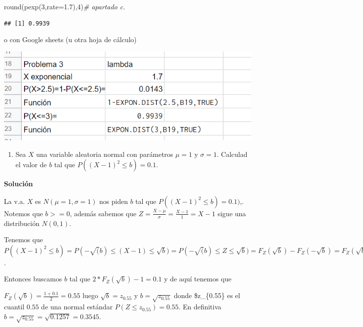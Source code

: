 \documentclass[
]{article}
\newenvironment{Shaded}{\begin{snugshade}}{\end{snugshade}}
\newcommand{\AttributeTok}[1]{\textcolor[rgb]{0.77,0.63,0.00}{#1}}
\newcommand{\CommentTok}[1]{\textcolor[rgb]{0.56,0.35,0.01}{\textit{#1}}}
\newcommand{\DecValTok}[1]{\textcolor[rgb]{0.00,0.00,0.81}{#1}}
\newcommand{\FloatTok}[1]{\textcolor[rgb]{0.00,0.00,0.81}{#1}}
\newcommand{\FunctionTok}[1]{\textcolor[rgb]{0.00,0.00,0.00}{#1}}
\newcommand{\NormalTok}[1]{#1}
\providecommand{\tightlist}{%
  \setlength{\itemsep}{0pt}\setlength{\parskip}{0pt}}
\begin{document}
\begin{Shaded}
\begin{Highlighting}[]
\FunctionTok{round}\NormalTok{(}\FunctionTok{pexp}\NormalTok{(}\DecValTok{3}\NormalTok{,}\AttributeTok{rate=}\FloatTok{1.7}\NormalTok{),}\DecValTok{4}\NormalTok{)}\CommentTok{\# apartado c.}
\end{Highlighting}
\end{Shaded}

\begin{verbatim}
## [1] 0.9939
\end{verbatim}

o con Google sheets (u otra hoja de cálculo)

\includegraphics[width=8.85in]{pro3_cont_1}

\newpage

\begin{enumerate}
\def\labelenumi{\arabic{enumi}.}
\setcounter{enumi}{3}
\tightlist
\item
  Sea \(X\) una variable aleatoria normal con parámetros \(\mu=1\) y
  \(\sigma=1\). Calculad el valor de \(b\) tal que
  \(P\left((X-1)^2\leq b\right)=0.1\).
\end{enumerate}

\textbf{Solución}

La v.a. \(X\) es \(N(\mu=1,\sigma=1)\) nos piden \(b\) tal que
\(P((X-1)^2\leq b)=0.1)\),. Notemos que \(b>=0\), además sabemos que
\(Z=\frac{X-\mu}{\sigma}=\frac{X-1}{1}=X-1\) sigue una distribución
\(N(0,1)\).

Tenemos que
\(P((X-1)^2\leq b)=P(-\sqrt(b)\leq (X-1)\leq\sqrt{b})=P(-\sqrt(b)\leq Z\leq \sqrt{b})=F_Z(\sqrt{b})-F_Z(-\sqrt{b})=F_Z(\sqrt{b})-(1-F_Z(\sqrt{b}))= 2*F_Z(\sqrt{b})-1\).

Entonces buscamos \(b\) tal que \(2*F_Z(\sqrt{b})-1=0.1\) y de aquí
tenemos que

\(F_Z(\sqrt{b})=\frac{1+0.1}{2}=0.55\) luego \(\sqrt{b}=z_{0.55}\) y
\(b=\sqrt{z_{0.55}}\) donde \$z\_\{0.55\} es el cuantil \(0.55\) de una
normal estándar \(P(Z\leq z_{0.55})=0.55.\) En definitiva
\(b=\sqrt{z_{0.55}}=\sqrt{0.1257}=0.3545.\)
\end{document}
